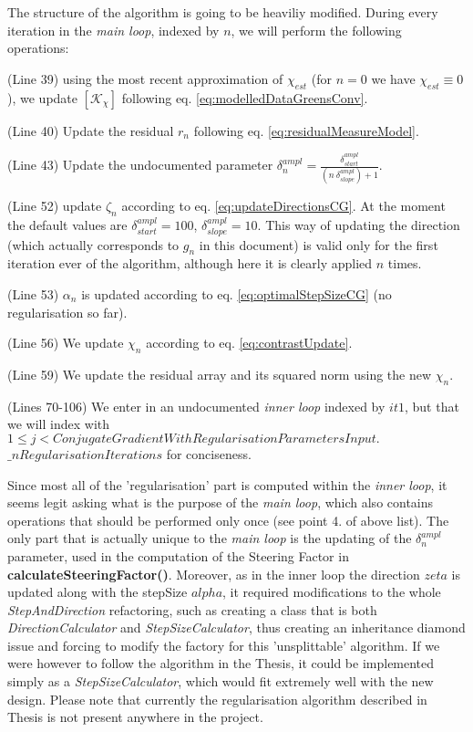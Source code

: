 \documentclass[10pt,a4paper]{article}
\begin{document}
{The structure of the algorithm is going to be heaviliy modified.
During every iteration in the \textit{main loop}, indexed by $n$, we will perform the following operations:}
\begin{enumerate}
\item (Line 39) using the most recent approximation of $\chi_{est} $ (for $n=0$ we have $\chi_{est} \equiv 0$), we update $[\mathcal{K}_\chi]$ following eq. \eqref{eq:modelledDataGreensConv}. 
\item (Line 40) Update the residual $r_n$ following eq. \eqref{eq:residualMeasureModel}.
{\item (Line 43) Update the undocumented parameter $\delta^{ampl}_n = \frac{\delta^{ampl}_{start}}{(n \ \delta^{ampl}_{slope}) +1}$.}
\item (Line 52) update $\zeta_n$ according to eq. \eqref{eq:updateDirectionsCG}. At the moment the default values are $\delta^{ampl}_{start} =100$, $\delta^{ampl}_{slope} =10$.
{This way of updating the direction (which actually corresponds to $g_n$ in this document) is valid only for the first iteration ever of the algorithm, although here it is clearly applied $n$ times.}
\item (Line 53)  $\alpha_n$ is updated according to eq. \eqref{eq:optimalStepSizeCG} (no regularisation so far).
\item (Line 56) We update $\chi_n$ according to eq. \eqref{eq:contrastUpdate}.
\item (Line 59) We update the residual array and its squared norm using the new $\chi_n$.
{\item (Lines 70-106) We enter in an undocumented \textit{inner loop} indexed by $it1$, but that we will index with $1\leq j <  ConjugateGradientWithRegularisationParametersInput.$ $ \_nRegularisationIterations$ for conciseness.}
\end{enumerate}
{
Since most all of the 'regularisation' part is computed within the \textit{inner loop}, it seems legit asking what is the purpose of the \textit{main loop}, which also contains operations that should be performed only once (see point 4. of above list).
The only part that is actually unique to the \textit{main loop} is the updating of the $\delta^{ampl}_n$ parameter, used in the computation of the Steering Factor in \textbf{calculateSteeringFactor()}.
\newline
Moreover, as in the inner loop the direction $zeta$ is updated along with the stepSize $alpha$, it required modifications to the whole \textit{StepAndDirection} refactoring, such as creating a class that is both \textit{DirectionCalculator} and \textit{StepSizeCalculator}, thus creating an inheritance diamond issue and forcing to modify the factory for this 'unsplittable' algorithm.
If we were however to follow the algorithm in the Thesis, it could be implemented simply as a \textit{StepSizeCalculator}, which would fit extremely well with the new design.
Please note that currently the regularisation algorithm described in Thesis is not present anywhere in the project.
\newline
}
\end{document}
